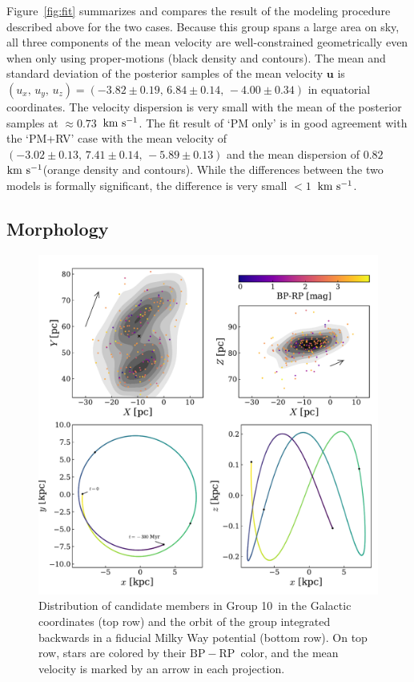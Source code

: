 \documentclass[modern,letterpaper]{aastex61}
\newcommand{\figname}{Figure}
\newcommand{\groupTen}{Group 10}
\newcommand{\bs}[1]{\boldsymbol{#1}}
\renewcommand{\vec}[1]{\bs{#1}}
\newcommand{\kms}{\ensuremath{\rm km~s^{-1}}}
\newcommand{\bprp}{\ensuremath{\mathrm{BP}-\mathrm{RP}}}
\begin{document}
\figname~\ref{fig:fit} summarizes and compares the result of the modeling procedure described above for the two cases.
Because this group spans a large area on sky, all three components of the mean
velocity are well-constrained geometrically even when only using proper-motions
(black density and contours).
The mean and standard deviation of the posterior samples of the mean velocity $\vec{u}$
is $(u_x,\,u_y,\,u_z) = (-3.82\pm0.19,\,6.84\pm0.14,\,-4.00\pm0.34)$ in
equatorial coordinates.
The velocity dispersion is very small with the mean of the posterior samples at
$\approx 0.73$~\kms.
The fit result of `PM only' is in good agreement with the `PM+RV' case
with the mean velocity of $(-3.02\pm0.13,\,7.41\pm0.14,\,-5.89\pm0.13)$ and
the mean dispersion of $0.82$~\kms (orange density and contours).
While the differences between the two models is formally significant,
the difference is very small $<1$~\kms.

\subsection{Morphology}

\begin{figure}
  \includegraphics[width=0.95\linewidth]{orbit_morphology.pdf}
  \caption{Distribution of candidate members in \groupTen\ in
    the Galactic coordinates (top row) and the orbit of the group
    integrated backwards in
    a fiducial Milky Way potential (bottom row).
    On top row, stars are colored by their \bprp\ color, and
    the mean velocity is marked by an arrow in each projection.}
  \label{fig:orbit_morphology}
\end{figure}
\end{document}
